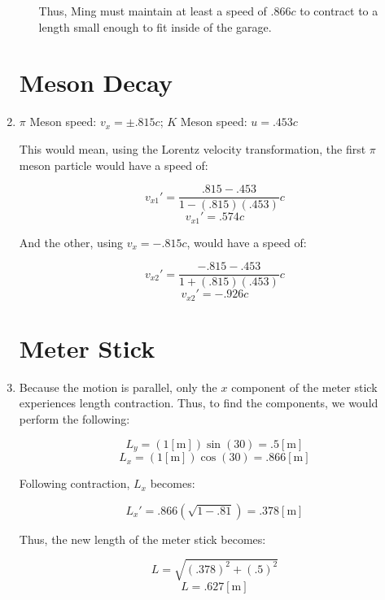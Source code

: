\begin{enumerate}
\begin{enumerate}
        Thus, Ming must maintain at least a speed of $.866c$ to contract to a length small enough to fit inside of the garage.

    \end{enumerate}

    \section{Meson Decay}

  \item $\pi$ Meson speed: $v_x=\pm.815c$; $K$ Meson speed: $u=.453c$

    This would mean, using the Lorentz velocity transformation, the first $\pi$ meson particle would have a speed of:

    $$v_{x1}'=\frac{.815-.453}{1-(.815)(.453)}c$$
    $$\boxed{v_{x1}'=.574c}$$

    And the other, using $v_x=-.815c$, would have a speed of:

    $$v_{x2}'=\frac{-.815-.453}{1+(.815)(.453)}c$$
    $$\boxed{v_{x2}'=-.926c}$$

    \section{Meter Stick}

  \item Because the motion is parallel, only the $x$ component of the meter stick experiences length contraction. Thus, to find the components, we would perform the following:

    $$L_y=(1[\si{\meter}])\sin(30)=.5[\si{\meter}]$$
    $$L_x=(1[\si{\meter}])\cos(30)=.866[\si{\meter}]$$

      Following contraction, $L_x$ becomes:

      $$L_x'=.866(\sqrt{1-.81})=.378[\si{\meter}]$$

      Thus, the new length of the meter stick becomes:

      $$L=\sqrt{(.378)^2+(.5)^2}$$
      $$\boxed{L=.627[\si{\meter}]}$$


\end{enumerate}




